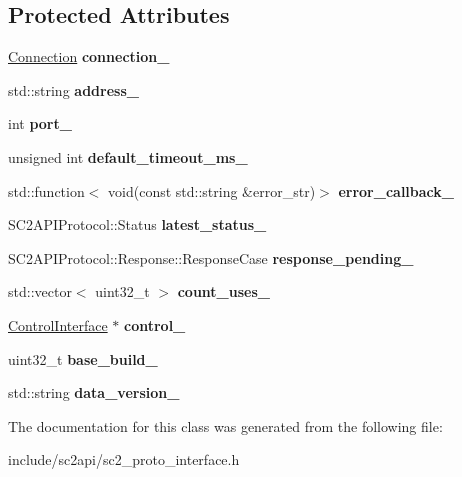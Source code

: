 \subsection*{Protected Attributes}
\begin{DoxyCompactItemize}
\item 
\mbox{\label{classsc2_1_1_proto_interface_a8fdac4b0429cbf86ec7c1edba4e326fc}} 
\hyperlink{classsc2_1_1_connection}{Connection} {\bfseries connection\+\_\+}
\item 
\mbox{\label{classsc2_1_1_proto_interface_a4d79099fa89d4bcc0bb001d27d7a801e}} 
std\+::string {\bfseries address\+\_\+}
\item 
\mbox{\label{classsc2_1_1_proto_interface_a15e1f66ed2cd1c0808f9bf500b81d0e6}} 
int {\bfseries port\+\_\+}
\item 
\mbox{\label{classsc2_1_1_proto_interface_a84700c40de82de13b594ed1efb22a214}} 
unsigned int {\bfseries default\+\_\+timeout\+\_\+ms\+\_\+}
\item 
\mbox{\label{classsc2_1_1_proto_interface_a13b6b03fa93720ba9c5f35791d4d8d45}} 
std\+::function$<$ void(const std\+::string \&error\+\_\+str)$>$ {\bfseries error\+\_\+callback\+\_\+}
\item 
\mbox{\label{classsc2_1_1_proto_interface_a01ca4c71c316152c099be11ba27eb27a}} 
S\+C2\+A\+P\+I\+Protocol\+::\+Status {\bfseries latest\+\_\+status\+\_\+}
\item 
\mbox{\label{classsc2_1_1_proto_interface_a7ce86c185be3b759be60f99d0fd933e1}} 
S\+C2\+A\+P\+I\+Protocol\+::\+Response\+::\+Response\+Case {\bfseries response\+\_\+pending\+\_\+}
\item 
\mbox{\label{classsc2_1_1_proto_interface_a13bdf9947b97df63442346b2f50e2391}} 
std\+::vector$<$ uint32\+\_\+t $>$ {\bfseries count\+\_\+uses\+\_\+}
\item 
\mbox{\label{classsc2_1_1_proto_interface_a7927936b004d254fba365487a1f0dcd9}} 
\hyperlink{classsc2_1_1_control_interface}{Control\+Interface} $\ast$ {\bfseries control\+\_\+}
\item 
\mbox{\label{classsc2_1_1_proto_interface_aa2c505d2b3019b09e78180af425d5aa0}} 
uint32\+\_\+t {\bfseries base\+\_\+build\+\_\+}
\item 
\mbox{\label{classsc2_1_1_proto_interface_ade08078ef981ae448ca0851714b23f3a}} 
std\+::string {\bfseries data\+\_\+version\+\_\+}
\end{DoxyCompactItemize}


The documentation for this class was generated from the following file\+:\begin{DoxyCompactItemize}
\item 
include/sc2api/sc2\+\_\+proto\+\_\+interface.\+h\end{DoxyCompactItemize}
